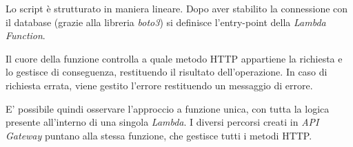 Lo script è strutturato in maniera lineare. Dopo aver stabilito la connessione con il database (grazie alla libreria \textit{boto3}) si definisce l'entry-point della \textit{Lambda Function}.

Il cuore della funzione controlla a quale metodo HTTP appartiene la richiesta e lo gestisce di conseguenza, restituendo il risultato dell'operazione. In caso di richiesta errata, viene gestito l'errore restituendo un messaggio di errore.

E' possibile quindi osservare l'approccio a funzione unica, con tutta la logica presente all'interno di una singola \textit{Lambda}. I diversi percorsi creati in \textit{API Gateway} puntano alla stessa funzione, che gestisce tutti i metodi HTTP.